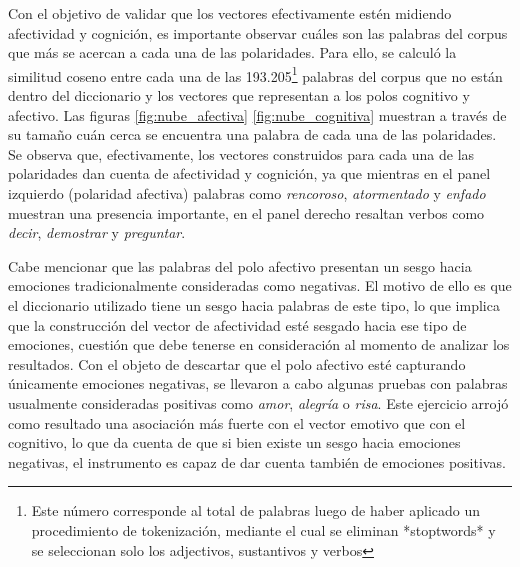 \documentclass[
  12pt,
]{article}
\begin{document}
Con el objetivo de validar que los vectores efectivamente estén midiendo
afectividad y cognición, es importante observar cuáles son las palabras
del corpus que más se acercan a cada una de las polaridades. Para ello,
se calculó la similitud coseno entre cada una de las
193.205\footnote{Este número corresponde al total de palabras luego de haber aplicado un procedimiento de tokenización, mediante el cual se eliminan *stoptwords* y se seleccionan solo los adjectivos, sustantivos y verbos}
palabras del corpus que no están dentro del diccionario y los vectores
que representan a los polos cognitivo y afectivo. Las figuras
\ref{fig:nube_afectiva} \ref{fig:nube_cognitiva} muestran a través de su
tamaño cuán cerca se encuentra una palabra de cada una de las
polaridades. Se observa que, efectivamente, los vectores construidos
para cada una de las polaridades dan cuenta de afectividad y cognición,
ya que mientras en el panel izquierdo (polaridad afectiva) palabras como
\emph{rencoroso}, \emph{atormentado} y \emph{enfado} muestran una
presencia importante, en el panel derecho resaltan verbos como
\emph{decir}, \emph{demostrar} y \emph{preguntar}.

Cabe mencionar que las palabras del polo afectivo presentan un sesgo
hacia emociones tradicionalmente consideradas como negativas. El motivo
de ello es que el diccionario utilizado tiene un sesgo hacia palabras de
este tipo, lo que implica que la construcción del vector de afectividad
esté sesgado hacia ese tipo de emociones, cuestión que debe tenerse en
consideración al momento de analizar los resultados. Con el objeto de
descartar que el polo afectivo esté capturando únicamente emociones
negativas, se llevaron a cabo algunas pruebas con palabras usualmente
consideradas positivas como \emph{amor}, \emph{alegría} o \emph{risa}.
Este ejercicio arrojó como resultado una asociación más fuerte con el
vector emotivo que con el cognitivo, lo que da cuenta de que si bien
existe un sesgo hacia emociones negativas, el instrumento es capaz de
dar cuenta también de emociones positivas.
\end{document}
